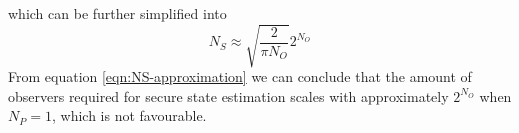 which can be further simplified into
\begin{equation}\label{eqn:NS-approximation}
    N_S \approx \sqrt{\frac{2}{\pi N_O}}2^{N_O}
\end{equation}
From equation \eqref{eqn:NS-approximation} we can conclude that the amount of observers required for secure state estimation scales with approximately $2^{N_O}$ when $N_P=1$, which is not favourable.